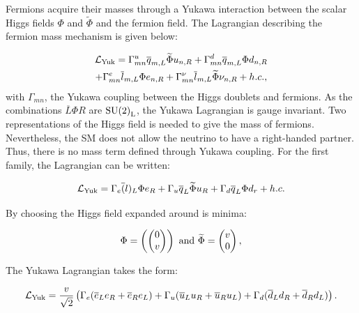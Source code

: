       Fermions acquire their masses through a Yukawa interaction between the scalar Higgs fields $\Phi$ and $\widetilde{\Phi}$ and the fermion field.
      The Lagrangian describing the fermion mass mechanism is given below:

      \begin{multline}
        \mathcal{L}_{\rm{Yuk}} = \Gamma^{u}_{mn} \overline{q}_{m,L} \widetilde{\Phi} u_{n,R} + \Gamma^{d}_{mn} \overline{q}_{m,L} \Phi d_{n,R} \\ 
        + \Gamma^{e}_{mn} \overline{l}_{m,L} \Phi e_{n,R} + \Gamma^{\nu}_{mn} \overline{l}_{m,L} \widetilde{\Phi} \nu_{n,R} + h.c., 
      \end{multline}
      with $\Gamma_{mn}$, the Yukawa coupling between the Higgs doublets and fermions.
      As the combinations $\overline{L} \Phi R$ are $\rm{SU(2)}_{\rm{L}}$, the Yukawa Lagrangian is gauge invariant.
      Two representations of the Higgs field is needed to give the mass of fermions.
      Nevertheless, the \gls{SM} does not allow the neutrino to have a right-handed partner.
      Thus, there is no mass term defined through Yukawa coupling.
      For the first family, the Lagrangian can be written:
      
      \begin{equation}
        \mathcal{L}_{\rm{Yuk}} = \Gamma_e \overline(l)_L \Phi e_R + \Gamma_u \overline{q}_L \widetilde{\Phi} u_R + \Gamma_d \overline{q}_L \Phi d_r + h.c.
      \end{equation}

      By choosing the Higgs field expanded around is minima:

      \begin{equation}
        \Phi = \left(
        \begin{pmatrix}
          0 \\
          v
        \end{pmatrix}
        \right)
        ~\rm{and}~
        \widetilde{\Phi} = \left(
        \begin{matrix}
          v \\
          0
        \end{matrix}
        \right),
      \end{equation}

      The Yukawa Lagrangian takes the form:

      \begin{equation}
        \mathcal{L}_{\rm{Yuk}} = \frac{v}{\sqrt{2}} \left( \Gamma_e (\overline{e}_L e_R + \overline{e}_R e_L)  + \Gamma_{u} (\overline{u}_L u_R + \overline{u}_R u_L) + \Gamma_{d} (\overline{d}_L d_R + \overline{d}_R d_L) \right).
      \end{equation}

